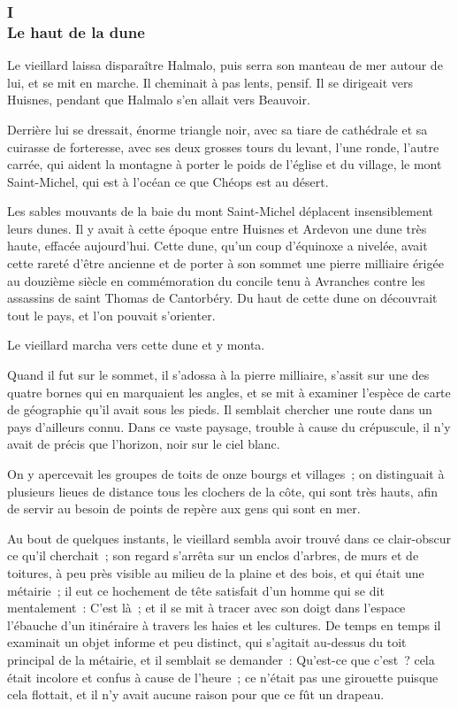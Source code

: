 \documentclass[french,twoside]{book} %
\begin{document}
\subsubsection[{I. Le haut de la dune}]{I \\
Le haut de la dune}
\label{p1l4c1}
\noindent Le vieillard laissa disparaître Halmalo, puis serra son manteau de mer autour de lui, et se mit en marche. Il cheminait à pas lents, pensif. Il se dirigeait vers Huisnes, pendant que Halmalo s’en allait vers Beauvoir.\par
Derrière lui se dressait, énorme triangle noir, avec sa tiare de cathédrale et sa cuirasse de forteresse, avec ses deux grosses tours du levant, l’une ronde, l’autre carrée, qui aident la montagne à porter le poids de l’église et du village, le mont Saint-Michel, qui est à l’océan ce que Chéops est au désert.\par
Les sables mouvants de la baie du mont Saint-Michel déplacent insensiblement leurs dunes. Il y avait à cette époque entre Huisnes et Ardevon une dune très haute, effacée aujourd’hui. Cette dune, qu’un coup d’équinoxe a nivelée, avait cette rareté d’être ancienne et de porter à son sommet une pierre milliaire érigée au douzième siècle en commémoration du concile  tenu à Avranches contre les assassins de saint Thomas de Cantorbéry. Du haut de cette dune on découvrait tout le pays, et l’on pouvait s’orienter.\par
Le vieillard marcha vers cette dune et y monta.\par
Quand il fut sur le sommet, il s’adossa à la pierre milliaire, s’assit sur une des quatre bornes qui en marquaient les angles, et se mit à examiner l’espèce de carte de géographie qu’il avait sous les pieds. Il semblait chercher une route dans un pays d’ailleurs connu. Dans ce vaste paysage, trouble à cause du crépuscule, il n’y avait de précis que l’horizon, noir sur le ciel blanc.\par
On y apercevait les groupes de toits de onze bourgs et villages ; on distinguait à plusieurs lieues de distance tous les clochers de la côte, qui sont très hauts, afin de servir au besoin de points de repère aux gens qui sont en mer.\par
Au bout de quelques instants, le vieillard sembla avoir trouvé dans ce clair-obscur ce qu’il cherchait ; son regard s’arrêta sur un enclos d’arbres, de murs et de toitures, à peu près visible au milieu de la plaine et des bois, et qui était une métairie ; il eut ce hochement de tête satisfait d’un homme qui se dit mentalement : C’est là ; et il se mit à tracer avec son doigt dans l’espace l’ébauche d’un itinéraire à travers les haies et les cultures. De temps en temps il examinait un objet informe et peu distinct, qui s’agitait au-dessus du toit principal de la métairie, et il semblait se demander : Qu’est-ce que c’est ? cela était incolore et confus à cause de l’heure ; ce n’était pas  une girouette puisque cela flottait, et il n’y avait aucune raison pour que ce fût un drapeau.\par
\end{document}
